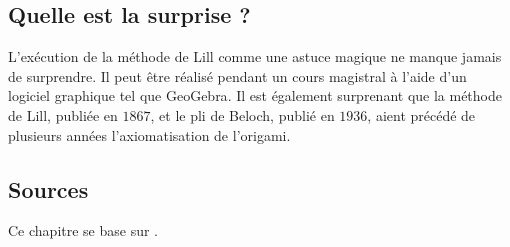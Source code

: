 

\subsection*{Quelle est la surprise ?}

L'exécution de la méthode de Lill comme une astuce magique ne manque jamais de surprendre. Il peut être réalisé pendant un cours magistral à l'aide d'un logiciel graphique tel que {GeoGebra}. Il est également surprenant que la méthode de Lill, publiée en $1867$, et le pli de Beloch, publié en $1936$, aient précédé de plusieurs années l'axiomatisation de l'origami.


\subsection*{Sources}

Ce chapitre se base sur 
 \cite{bradford, hull-beloch, riaz}.
